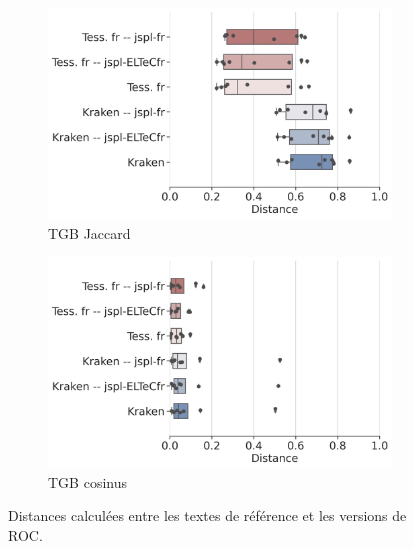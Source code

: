 \begin{figure}[h!]
         \begin{subfigure}{0.45\textwidth}
  \includegraphics[height=.65\textwidth]{IMAGES/Boite-moustache/TGB_REF_jaccard.png} 
        \caption{TGB Jaccard}
   \end{subfigure}
    \begin{subfigure}{0.5\textwidth}
  \includegraphics[height=.65\textwidth]{IMAGES/Boite-moustache/TGB_REF_cosinus.png} 
        \caption{TGB cosinus}
   \end{subfigure}
   
    \caption{Distances calculées entre les textes de référence et les versions de ROC.}
    \label{fig:distances_ref_roc}
\end{figure}

